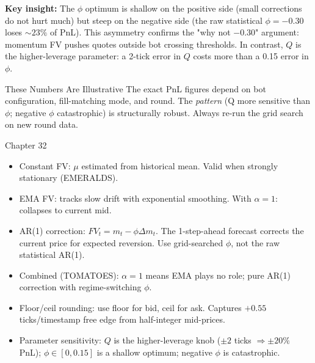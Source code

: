\documentclass[12pt,a4paper,openany]{report}
\theoremstyle{definition}
\begin{document}
\textbf{Key insight:} The $\phi$ optimum is shallow on the positive side (small corrections do not hurt much) but steep on the negative side (the raw statistical $\phi = -0.30$ loses $\sim 23\%$ of PnL). This asymmetry confirms the "why not $-0.30$" argument: momentum FV pushes quotes outside bot crossing thresholds. In contrast, $Q$ is the higher-leverage parameter: a 2-tick error in $Q$ costs more than a 0.15 error in $\phi$.

\begin{warningbox}{These Numbers Are Illustrative}
The exact PnL figures depend on bot configuration, fill-matching mode, and round. The \emph{pattern} (Q more sensitive than $\phi$; negative $\phi$ catastrophic) is structurally robust. Always re-run the grid search on new round data.
\end{warningbox}

\begin{takeawaybox}{Chapter 32}
\begin{itemize}
  \item Constant FV: $\mu$ estimated from historical mean. Valid when strongly stationary (EMERALDS).
  \item EMA FV: tracks slow drift with exponential smoothing. With $\alpha=1$: collapses to current mid.
  \item AR(1) correction: $FV_t = m_t - \phi\Delta m_t$. The 1-step-ahead forecast corrects the current price for expected reversion. Use grid-searched $\phi$, not the raw statistical AR(1).
  \item Combined (TOMATOES): $\alpha=1$ means EMA plays no role; pure AR(1) correction with regime-switching $\phi$.
  \item Floor/ceil rounding: use floor for bid, ceil for ask. Captures $+0.55$ ticks/timestamp free edge from half-integer mid-prices.
  \item Parameter sensitivity: $Q$ is the higher-leverage knob ($\pm 2$ ticks $\Rightarrow \pm 20\%$ PnL); $\phi \in [0, 0.15]$ is a shallow optimum; negative $\phi$ is catastrophic.
\end{itemize}
\end{takeawaybox}
\end{document}
